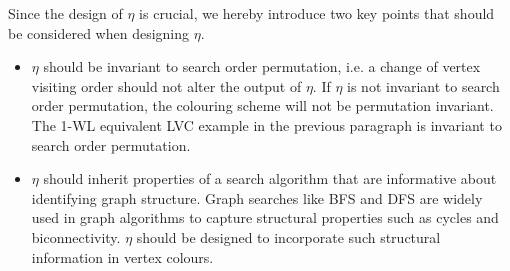 Since the design of $\eta$ is crucial, we hereby introduce two key points that should be considered when designing $\eta$. 
\begin{itemize}
    \item $\eta$ should be invariant to search order permutation, i.e. a change of vertex visiting order should not alter the output of $\eta$. If $\eta$ is not invariant to search order permutation, the colouring scheme will not be permutation invariant. The 1-WL equivalent LVC example in the previous paragraph is invariant to search order permutation. 
    \item $\eta$ should inherit properties of a search algorithm that are informative about identifying graph structure. Graph searches like BFS and DFS are widely used in graph algorithms to capture structural properties such as cycles and biconnectivity. $\eta$ should be designed to incorporate such structural information in vertex colours.
\end{itemize}




